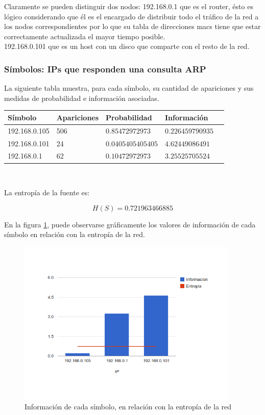 \documentclass{article}
\begin{document}
Claramente se pueden distinguir dos nodos:
192.168.0.1 que es el router, \'esto es l\'ogico considerando que \'el es el encargado de distribuir todo el tr\'afico de la red a los nodos correspondientes por lo que su tabla
de direcciones macs tiene que estar correctamente actualizada el mayor tiempo
posible.\\
192.168.0.101 que es un host con un disco que comparte con el resto de la red.\\
\newpage

\subsubsection{Símbolos: IPs que responden una consulta ARP}
La siguiente tabla muestra, para cada símbolo, su cantidad de apariciones y
sus medidas de probabilidad e información asociadas.

\vskip10pt

\begin{tabular}{|l|l|l|l|l|}
  \hline
  Símbolo & Apariciones & Probabilidad & Información \\
  \hline
  192.168.0.105 & 506 & $0.85472972973$ & $0.226459790935$ \\
  \hline
  192.168.0.101 & 24 & $0.0405405405405$ & $4.62449086491$ \\
  \hline
  192.168.0.1 & 62 & $0.10472972973$ & $3.25525705524$ \\
  \hline
\end{tabular}\\

\vskip10pt

La entropía de la fuente es:

$$H(S) = 0.721963466885$$

En la figura \ref{fig:red1repliers:infoentro}, puede observarse gráficamente
los valores de información de cada símbolo en relación con la entropía de la
red.

\begin{figure}[h!]
    \centering                                                       
    \includegraphics[width=300pt]{respuestas1.png}
    \caption{Información de cada símbolo, en relación con la
        entropía de la red}
    \label{fig:red1repliers:infoentro}
\end{figure}
\end{document}
